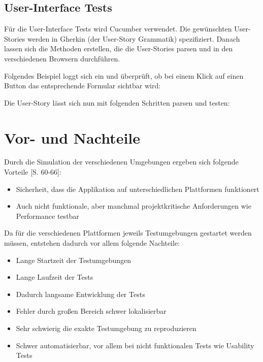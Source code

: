 \documentclass[a4paper,bibtotoc,oneside]{scrbook}
\begin{document}
\subsection{User-Interface Tests}
Für die User-Interface Tests wird Cucumber verwendet. Die gewünschten User-Stories werden in Gherkin (der User-Story Grammatik) spezifiziert. Danach lassen sich die Methoden erstellen, die die User-Stories parsen und in den verschiedenen Browsern durchführen.

Folgendes Beispiel loggt sich ein und überprüft, ob bei einem Klick auf einen Button das entsprechende Formular sichtbar wird:



Die User-Story lässt sich nun mit folgenden Schritten parsen und testen:



\section{Vor- und Nachteile}
Durch die Simulation der verschiedenen Umgebungen ergeben sich folgende Vorteile \cite{test_large_systems}[S. 60-66]:

\begin{itemize}
  \item Sicherheit, dass die Applikation auf unterschiedlichen Plattformen funktionert
  \item Auch nicht funktionale, aber manchmal projektkritische Anforderungen wie Performance testbar
\end{itemize}

Da für die verschiedenen Plattformen jeweils Testumgebungen gestartet werden müssen, entstehen dadurch vor allem folgende Nachteile:

\begin{itemize}
  \item Lange Startzeit der Testumgebungen
  \item Lange Laufzeit der Tests
  \item Dadurch langsame Entwicklung der Tests
  \item Fehler durch großen Bereich schwer lokalisierbar
  \item Sehr schwierig die exakte Testumgebung zu reproduzieren
  \item Schwer automatisierbar, vor allem bei nicht funktionalen Tests wie Usability Tests
\end{itemize}
\end{document}
